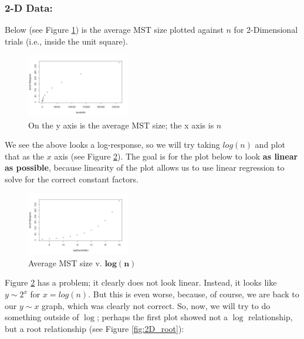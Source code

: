 \documentclass[conference]{styles/acmsiggraph}
\newcommand{\?}{\stackrel{?}{=}}
\begin{document}
\subsubsection{2-D Data:} 

Below (see Figure \ref{fig:2DvN}) is the average MST size plotted against $n$ for 2-Dimensional trials (i.e., inside the unit square). 

\begin{figure}[h!]
    \centering
    \includegraphics[width=0.4\textwidth]{2dplotlinear.png}
    \caption{On the y axis is the average MST size; the x axis is $n$}
    \label{fig:2DvN}
\end{figure}
\FloatBarrier %

We see the above looks a log-response, so we will try taking $log(n)$ and plot that as the $x$ axis (see Figure \ref{fig:2D_log}).  The goal is for the plot below to look \textbf{as linear as possible}, because linearity of the plot allows us to use linear regression to solve for the correct constant factors.  

\begin{figure}[h!]
    \centering
    \includegraphics[width=0.4\textwidth]{2dplotlog.png}
    \caption{Average MST size v. $\mathbf{log(n)}$}
    \label{fig:2D_log}
\end{figure}
\FloatBarrier %

Figure \ref{fig:2D_log} has a problem; it clearly does not look linear.  Instead, it looks like $y\sim 2^x$ for $x=log(n)$.  But this is even worse, because, of course, we are back to our $y\sim x$ graph, which was clearly not correct.  So, now, we will try to do something outside of $\log$; perhaps the first plot showed not a $\log$ relationship, but a root relationship (see Figure \ref{fig:2D_root}):
\end{document}
